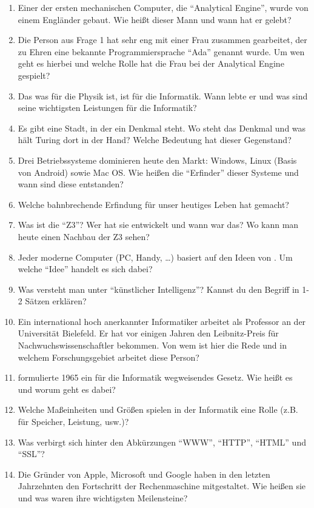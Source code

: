 \documentclass[10pt, a4paper]{scrartcl}
\begin{document}
\begin{enumerate}
	\item Einer der ersten mechanischen Computer, die \enquote{Analytical Engine}, wurde von einem Engländer gebaut. Wie heißt dieser Mann und wann hat er gelebt?
	\item Die Person aus Frage 1 hat sehr eng mit einer Frau zusammen gearbeitet, der zu Ehren eine bekannte Programmiersprache \enquote{Ada} genannt wurde. Um wen geht es hierbei und welche Rolle hat die Frau bei der Analytical Engine gespielt?
	\item Das was  für die Physik ist, ist  für die Informatik. 
	Wann lebte er und was sind seine wichtigsten Leistungen für die Informatik?
	\item Es gibt eine Stadt, in der ein Denkmal  steht. Wo steht das Denkmal und was hält Turing dort in der Hand? Welche Bedeutung hat dieser Gegenstand?
	\item Drei Betriebssysteme dominieren heute den Markt: Windows, Linux (Basis von Android) sowie Mac OS. Wie heißen die \enquote{Erfinder} dieser Systeme und wann sind diese entstanden? 
	\item Welche bahnbrechende Erfindung für unser heutiges Leben hat  gemacht?
	\item Was ist die \enquote{Z3}? Wer hat sie entwickelt und wann war das? Wo kann man heute einen Nachbau der Z3 sehen?
	\item Jeder moderne Computer (PC, Handy, …) basiert auf den Ideen von . Um welche \enquote{Idee} handelt es sich dabei?
	\item Was versteht man unter \enquote{künstlicher Intelligenz}? Kannst du den Begriff in 1-2 Sätzen erklären?
	\item Ein international hoch anerkannter Informatiker arbeitet als Professor an der Universität Bielefeld. Er hat vor einigen Jahren den Leibnitz-Preis für Nachwuchswissenschaftler bekommen. Von wem ist hier die Rede und in welchem Forschungsgebiet arbeitet diese Person?
	\item {} formulierte 1965 ein für die Informatik wegweisendes Gesetz. Wie heißt es und worum geht es dabei?
	\item Welche Maßeinheiten und Größen spielen in der Informatik eine Rolle (z.B. für Speicher, Leistung, usw.)?
	\item Was verbirgt sich hinter den Abkürzungen \enquote{WWW}, \enquote{HTTP}, \enquote{HTML} und \enquote{SSL}?
	\item Die Gründer von Apple, Microsoft und Google haben in den letzten Jahrzehnten den Fortschritt der Rechenmaschine mitgestaltet. Wie heißen sie und was waren ihre wichtigsten Meilensteine?
\end{enumerate}
\end{document}
